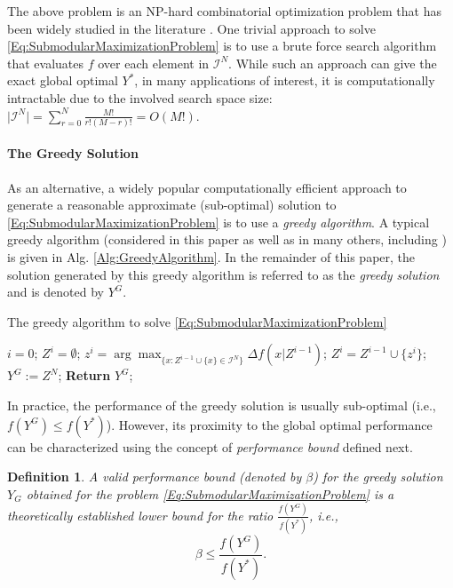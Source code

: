 \documentclass[conference]{IEEEtran}
\newtheorem{definition}{Definition}
\begin{document}
The above problem is an NP-hard combinatorial optimization problem that has been widely studied in the literature \cite{Liu2018}. One trivial approach to solve \eqref{Eq:SubmodularMaximizationProblem} is to use a brute force search algorithm that evaluates $f$ over each element in $\mathcal{I}^N$. While such an approach can give the exact global optimal $Y^*$, in many applications of interest, it is computationally intractable due to the involved search space size: $\vert \mathcal{I}^N \vert = \sum_{r=0}^N \frac{M!}{r!(M-r)!} = O(M!)$.   



\paragraph*{\textbf{The Greedy Solution}}

As an alternative, a widely popular computationally efficient approach to generate a reasonable approximate (sub-optimal) solution to \eqref{Eq:SubmodularMaximizationProblem} is to use a \emph{greedy algorithm}. A typical greedy algorithm (considered in this paper as well as in many others, including \cite{Nemhauser1978,Conforti1984,Wang2016,Liu2018}) is given in Alg. \ref{Alg:GreedyAlgorithm}. In the remainder of this paper, the solution generated by this greedy algorithm is referred to as the \emph{greedy solution} and is denoted by $Y^G$. 


\begin{algorithm}[!h]
\caption{The greedy algorithm to solve \eqref{Eq:SubmodularMaximizationProblem}}\label{Alg:GreedyAlgorithm}
\begin{algorithmic}[1]
\State $i=0$; $Z^i = \emptyset$;  
    \State $z^{i} = \arg \max_{\{x:Z^{i-1} \cup \{x\} \in \mathcal{I}^N\}} \Delta f(x \vert Z^{i-1})$;
    \State $Z^{i} = Z^{i-1} \cup \{z^{i}\}$; 
\EndFor
\State $Y^G := Z^N$;  \textbf{Return} $Y^G$;
\end{algorithmic}
\end{algorithm}


% 
In practice, the performance of the greedy solution is usually sub-optimal (i.e., $f(Y^G) \leq f(Y^*)$). However, its proximity to the global optimal performance can be characterized using the concept of \emph{performance bound} defined next. 

\begin{definition}\label{Def:PerformanceBound}
A valid \emph{performance bound} (denoted by $\beta$) for the greedy solution $Y_G$ obtained for the problem \eqref{Eq:SubmodularMaximizationProblem} is a theoretically established lower bound for the ratio $\frac{f(Y^G)}{f(Y^*)}$, i.e., 
\begin{equation}\label{Eq:Def:PerformanceBound}
    \beta \leq \frac{f(Y^G)}{f(Y^*)}.
\end{equation}
\end{definition}
\end{document}

